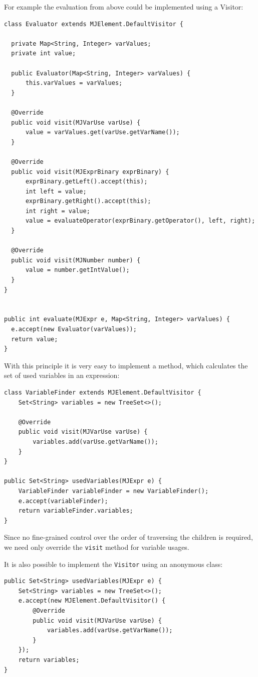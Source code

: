 \documentclass{scrartcl}
\begin{document}
For example the evaluation from above could be implemented using a Visitor:

\begin{lstlisting}
class Evaluator extends MJElement.DefaultVisitor {

  private Map<String, Integer> varValues;
  private int value;

  public Evaluator(Map<String, Integer> varValues) {
      this.varValues = varValues;
  }

  @Override
  public void visit(MJVarUse varUse) {
      value = varValues.get(varUse.getVarName());
  }

  @Override
  public void visit(MJExprBinary exprBinary) {
      exprBinary.getLeft().accept(this);
      int left = value;
      exprBinary.getRight().accept(this);
      int right = value;
      value = evaluateOperator(exprBinary.getOperator(), left, right);
  }

  @Override
  public void visit(MJNumber number) {
      value = number.getIntValue();
  }
}


public int evaluate(MJExpr e, Map<String, Integer> varValues) {
  e.accept(new Evaluator(varValues));
  return value;
}
\end{lstlisting}

With this principle it is very easy to implement a method, which calculates the set of used variables in an expression:

\begin{lstlisting}
class VariableFinder extends MJElement.DefaultVisitor {
    Set<String> variables = new TreeSet<>();

    @Override
    public void visit(MJVarUse varUse) {
        variables.add(varUse.getVarName());
    }
}

public Set<String> usedVariables(MJExpr e) {
    VariableFinder variableFinder = new VariableFinder();
    e.accept(variableFinder);
    return variableFinder.variables;
}
\end{lstlisting}

Since no fine-grained control over the order of traversing the children is required, we need only override the \lstinline!visit! method for variable usages.

It is also possible to implement the \lstinline!Visitor! using an anonymous class:

\begin{lstlisting}
public Set<String> usedVariables(MJExpr e) {
    Set<String> variables = new TreeSet<>();
    e.accept(new MJElement.DefaultVisitor() {
        @Override
        public void visit(MJVarUse varUse) {
            variables.add(varUse.getVarName());
        }
    });
    return variables;
}
\end{lstlisting}
\end{document}
